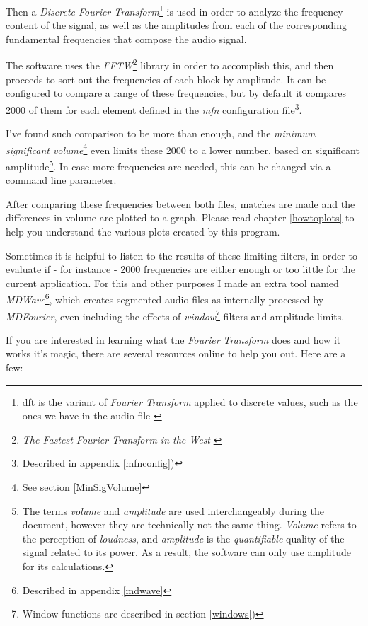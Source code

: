 \documentclass[10pt,a4paper]{report}
\begin{document}
Then a \textit{Discrete Fourier Transform}\footnote{\gls{dft} is the variant of \textit{Fourier Transform} applied to discrete values, such as the ones we have in the audio file \cite{FourierTransformApps}} is used in order to analyze the frequency content of the signal, as well as the amplitudes from each of the corresponding fundamental frequencies that compose the audio signal.

The software uses the \textit{FFTW}\footnote{\textit{The Fastest Fourier Transform in the West} \cite{fftw}} library in order to accomplish this, and then proceeds to sort out the frequencies of each block by amplitude. It can be configured to compare a range of these frequencies, but by default it compares 2000 of them for each element defined in the \textit{mfn} configuration file\footnote{Described in appendix \ref{mfnconfig})}.

I've found such comparison to be more than enough, and the \textit{minimum significant volume}\footnote{See section \ref{MinSigVolume}} even limits these 2000 to a lower number, based on significant amplitude\footnote{The terms \textit{volume} and \textit{amplitude} are used interchangeably during the document, however they are technically not the same thing. \textit{Volume} refers to the perception of \textit{loudness}, and \textit{amplitude} is the \textit{quantifiable} quality of the signal related to its power. As a result, the software can only use amplitude for its calculations.}. In case more frequencies are needed, this can be changed via a command line parameter.

After comparing these frequencies between both files, matches are made and the differences in volume are plotted to a graph. Please read chapter \ref{howtoplots} to help you understand the various plots created by this program.

Sometimes it is helpful to listen to the results of these limiting filters, in order to evaluate if - for instance - 2000 frequencies are either enough or too little for the current application. For this and other purposes I made an extra tool named \textit{MDWave}\footnote{Described in appendix \ref{mdwave}}, which creates segmented audio files as internally processed by \textit{MDFourier}, even including the effects of \textit{window}\footnote{Window functions are described in section \ref{windows})} filters and amplitude limits.

If you are interested in learning what the \textit{Fourier Transform} does and how it works it's magic, there are several resources online to help you out. Here are a few:
\end{document}
